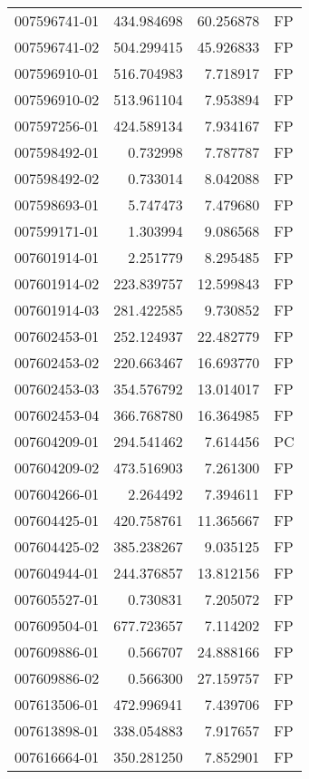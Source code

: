 \begin{tabular}{lrrl}
007596741-01 &  434.984698 &    60.256878 &   FP \\
007596741-02 &  504.299415 &    45.926833 &   FP \\
007596910-01 &  516.704983 &     7.718917 &   FP \\
007596910-02 &  513.961104 &     7.953894 &   FP \\
007597256-01 &  424.589134 &     7.934167 &   FP \\
007598492-01 &    0.732998 &     7.787787 &   FP \\
007598492-02 &    0.733014 &     8.042088 &   FP \\
007598693-01 &    5.747473 &     7.479680 &   FP \\
007599171-01 &    1.303994 &     9.086568 &   FP \\
007601914-01 &    2.251779 &     8.295485 &   FP \\
007601914-02 &  223.839757 &    12.599843 &   FP \\
007601914-03 &  281.422585 &     9.730852 &   FP \\
007602453-01 &  252.124937 &    22.482779 &   FP \\
007602453-02 &  220.663467 &    16.693770 &   FP \\
007602453-03 &  354.576792 &    13.014017 &   FP \\
007602453-04 &  366.768780 &    16.364985 &   FP \\
007604209-01 &  294.541462 &     7.614456 &   PC \\
007604209-02 &  473.516903 &     7.261300 &   FP \\
007604266-01 &    2.264492 &     7.394611 &   FP \\
007604425-01 &  420.758761 &    11.365667 &   FP \\
007604425-02 &  385.238267 &     9.035125 &   FP \\
007604944-01 &  244.376857 &    13.812156 &   FP \\
007605527-01 &    0.730831 &     7.205072 &   FP \\
007609504-01 &  677.723657 &     7.114202 &   FP \\
007609886-01 &    0.566707 &    24.888166 &   FP \\
007609886-02 &    0.566300 &    27.159757 &   FP \\
007613506-01 &  472.996941 &     7.439706 &   FP \\
007613898-01 &  338.054883 &     7.917657 &   FP \\
007616664-01 &  350.281250 &     7.852901 &   FP \\

\end{tabular}
